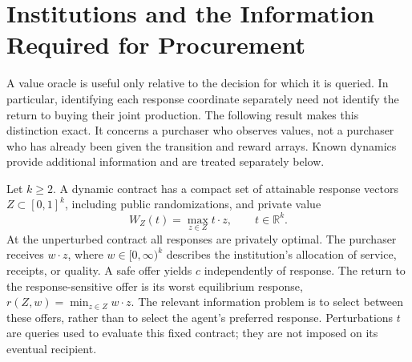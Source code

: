 \section{Institutions and the Information Required for Procurement}
\label{sec:r19-information}
A value oracle is useful only relative to the decision for which it is queried. In particular, identifying each response coordinate separately need not identify the return to buying their joint production. The following result makes this distinction exact. It concerns a purchaser who observes values, not a purchaser who has already been given the transition and reward arrays. Known dynamics provide additional information and are treated separately below.

Let $k\geq2$. A dynamic contract has a compact set of attainable response vectors $Z\subset[0,1]^k$, including public randomizations, and private value
\begin{equation}
 W_Z(t)=\max_{z\in Z}t\cdot z,\qquad t\in\mathbb R^k.
 \label{eq:r19-support-oracle}
\end{equation}
At the unperturbed contract all responses are privately optimal. The purchaser receives $w\cdot z$, where $w\in[0,\infty)^k$ describes the institution's allocation of service, receipts, or quality. A safe offer yields $c$ independently of response. The return to the response-sensitive offer is its worst equilibrium response, $r(Z,w)=\min_{z\in Z}w\cdot z$. The relevant information problem is to select between these offers, rather than to select the agent's preferred response. Perturbations $t$ are queries used to evaluate this fixed contract; they are not imposed on its eventual recipient.

